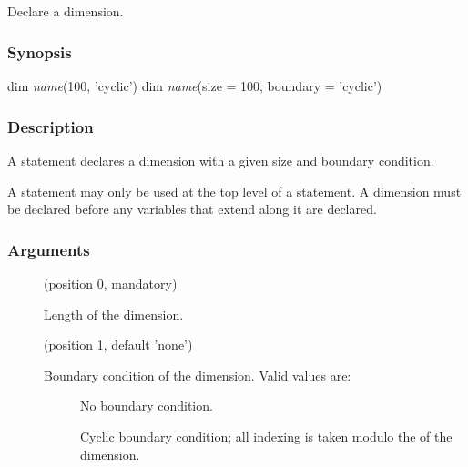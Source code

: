 \subsection{\label{dim}}

Declare a dimension.

\subsubsection*{Synopsis\label{dim_Synopsis}}
\begin{bicode}
dim \textsl{name}(100, 'cyclic')
dim \textsl{name}(size = 100, boundary = 'cyclic')
\end{bicode}


\subsubsection*{Description\label{dim_Description}}

A  statement declares a dimension with a given size and boundary
condition.

A  statement may only be used at the top level of a 
statement. A dimension must be declared before any variables that extend along
it are declared.

\subsubsection*{Arguments\label{dim_Arguments}}

\begin{description}
\item[] (position 0, mandatory)

Length of the dimension.

\item[] (position 1, default 'none')

Boundary condition of the dimension. Valid values are:

\begin{description}
\item[]

No boundary condition.

\item[]

Cyclic boundary condition; all indexing is taken modulo the  of
the dimension.
\end{description}
\end{description}


